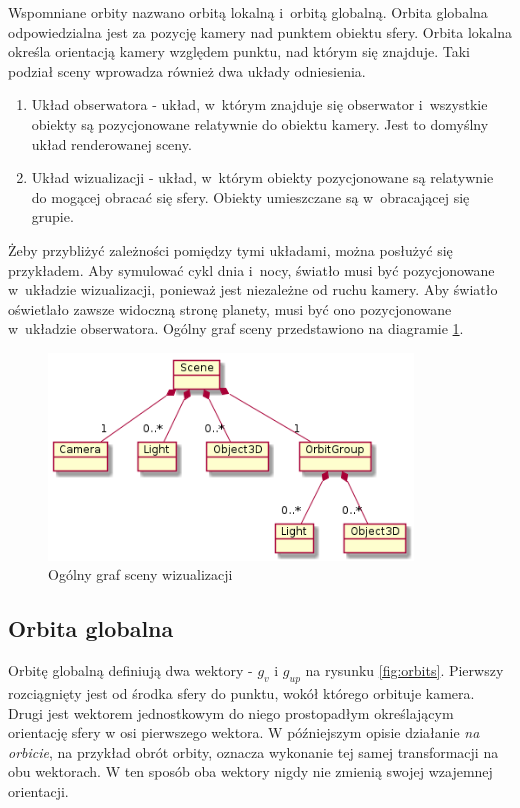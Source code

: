 Wspomniane orbity nazwano orbitą lokalną i~orbitą globalną. Orbita globalna odpowiedzialna jest za pozycję kamery nad punktem obiektu sfery. Orbita lokalna określa orientacją kamery względem punktu, nad którym się znajduje. Taki podział sceny wprowadza również dwa układy odniesienia.

\begin{enumerate}
    \item Układ obserwatora - układ, w~którym znajduje się obserwator i~wszystkie obiekty są pozycjonowane relatywnie do obiektu kamery. Jest to domyślny układ renderowanej sceny.
    \item Układ wizualizacji - układ, w~którym obiekty pozycjonowane są relatywnie do mogącej obracać się sfery. Obiekty umieszczane są w~obracającej się grupie.
\end{enumerate}

Żeby przybliżyć zależności pomiędzy tymi układami, można posłużyć się przykładem. Aby symulować cykl dnia i~nocy, światło musi być pozycjonowane w~układzie wizualizacji, ponieważ jest niezależne od ruchu kamery. Aby światło oświetlało zawsze widoczną stronę planety, musi być ono pozycjonowane w~układzie obserwatora. Ogólny graf sceny przedstawiono na diagramie \ref{fig:c3_scene_graph}.

\begin{figure}[h]
    \centering
    \includegraphics[height=5.5cm]{diagrams/out/c3_scene_graph.png}
    \caption{Ogólny graf sceny wizualizacji}
    \label{fig:c3_scene_graph}
\end{figure}

\subsection{Orbita globalna}

Orbitę globalną definiują dwa wektory - $g_v$ i $g_{up}$ na rysunku \ref{fig:orbits}. Pierwszy rozciągnięty jest od środka sfery do punktu, wokół którego orbituje kamera. Drugi jest wektorem jednostkowym do niego prostopadłym określającym orientację sfery w osi pierwszego wektora. W późniejszym opisie działanie \textit{na orbicie}, na przykład obrót orbity, oznacza wykonanie tej samej transformacji na obu wektorach. W ten sposób oba wektory nigdy nie zmienią swojej wzajemnej orientacji.

